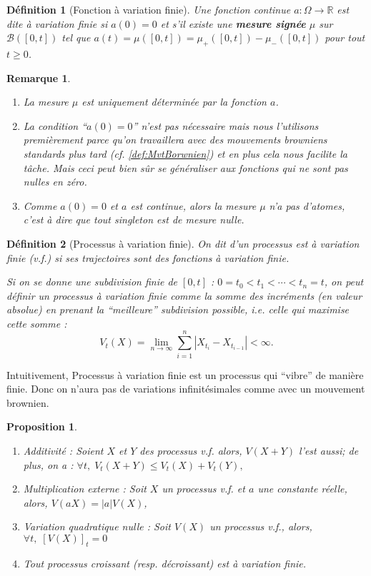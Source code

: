 \documentclass[openany]{book}
\newcommand{\R}{\mathbb{R}}
\newcommand{\1}{\mathbbm{1}}
\theoremstyle{thmfont}
\theoremstyle{deffont}
\newtheorem{definition}[definition]{Définition}
\theoremstyle{thmfont}
\newtheorem{prop}[prop]{Proposition}
\theoremstyle{deffont}
\newtheorem*{remark}{Remarque}
\begin{document}
\begin{definition}[Fonction à variation finie] Une fonction continue $a : \Omega \rightarrow \R$ est dite \textit{à variation finie} si $a(0) = 0$ et s'il existe une \textbf{mesure signée} $\mu$ sur $\mathcal B([0,t])$ tel que $a(t) = \mu([0,t]) = \mu_+([0,t]) - \mu_-([0,t])$ pour tout $t \geq 0$.
\label{def:fct_var_finie}
\end{definition}

\begin{remark}
  \begin{enumerate}
  \item La mesure $\mu$ est uniquement déterminée par la fonction $a$.
  \item La condition ``$a(0)=0$'' n'est pas nécessaire mais nous l'utilisons premièrement parce qu'on travaillera avec des mouvements browniens standards plus tard (cf. \autoref{def:MvtBorwnien}) et en plus cela nous facilite la tâche. Mais ceci peut bien sûr se généraliser aux fonctions qui ne sont pas nulles en zéro.
  \item Comme $a(0) = 0$ et $a$ est continue, alors la mesure $\mu$ n'a pas d'\textit{atomes}, c'est à dire que tout singleton est de mesure nulle.
  \end{enumerate}
\end{remark}

\begin{definition}[Processus à variation finie]
  On dit d'un processus est \textit{à variation finie} (v.f.) si ses trajectoires sont des fonctions à variation finie.

  Si on se donne une subdivision finie de $[0,t]$ :  $0 = t_0 < t_1 < \cdots < t_n = t$, on peut définir un processus à variation finie comme la somme des incréments (en valeur absolue) en prenant la ``meilleure'' subdivision possible, i.e. celle qui maximise cette somme :
  $$ V_t(X) = \lim_{n \to \infty} \sum_{i=1}^n |X_{t_i} - X_{t_{i-1}}| < \infty.$$
\end{definition}

Intuitivement, Processus à variation finie est un processus qui ``vibre'' de manière finie. Donc on n'aura pas de variations infinitésimales comme avec un mouvement brownien.

\begin{prop}
  \begin{enumerate}[nosep]
  \item Additivité : Soient $X$ et $Y$ des processus v.f. alors, $V(X+Y)$ l'est aussi; de plus, on a : $\forall t, \; V_t(X+Y) \leq V_t(X)+V_t(Y),$
  \item Multiplication externe : Soit $X$ un processus v.f. et $a$ une constante réelle, alors, $V(aX) = |a| V(X)$,
  \item Variation quadratique nulle : Soit $V(X)$ un processus v.f., alors,\\ $\forall t,\; [V(X)]_t=0$
  \item Tout processus croissant (resp. décroissant) est à variation finie.
  \end{enumerate}
\end{prop}
\end{document}
